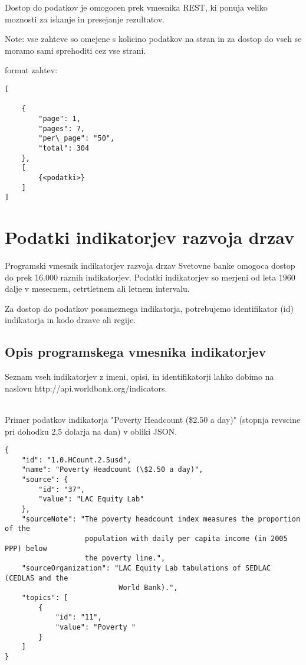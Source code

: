 Dostop do podatkov je omogocen prek vmesnika REST, ki ponuja veliko moznosti 
za iskanje in presejanje rezultatov. 


Note: vse zahteve so omejene s kolicino podatkov na stran in za dostop do vseh
se moramo sami sprehoditi cez vse strani.

format zahtev:

\begin{lstlisting}
[

    {
        "page": 1,
        "pages": 7,
        "per\_page": "50",
        "total": 304
    },
    [
        {<podatki>}
	]
]
\end{lstlisting}





\section{Podatki indikatorjev razvoja drzav}

Programski vmesnik indikatorjev razvoja drzav Svetovne banke omogoca dostop
do prek 16.000 raznih indikatorjev. Podatki indikatorjev so merjeni od leta
1960 dalje v mesecnem, cetrtletnem ali letnem intervalu. 


Za dostop do podatkov posameznega indikatorja, potrebujemo identifikator (id)
indikatorja in kodo drzave ali regije. 


\subsection{Opis programskega vmesnika indikatorjev}
Seznam vseh indikatorjev z imeni, opisi, in identifikatorji lahko dobimo na 
naslovu http://api.worldbank.org/indicators.

\ \\
Primer podatkov indikatorja "Poverty Headcount (\$2.50 a day)" (stopnja revscine
pri dohodku 2,5 dolarja na dan) v obliki JSON.

\begin{lstlisting}
{
    "id": "1.0.HCount.2.5usd",
    "name": "Poverty Headcount (\$2.50 a day)",
    "source": {
        "id": "37",
        "value": "LAC Equity Lab"
    },
    "sourceNote": "The poverty headcount index measures the proportion of the 
                   population with daily per capita income (in 2005 PPP) below
                   the poverty line.",
    "sourceOrganization": "LAC Equity Lab tabulations of SEDLAC (CEDLAS and the
                           World Bank).",
    "topics": [
        {
            "id": "11",
            "value": "Poverty "
        }
    ]
}
\end{lstlisting}


